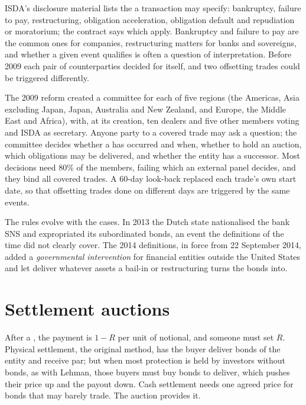 ISDA's disclosure material lists the  a transaction may specify:
bankruptcy, failure to pay, restructuring, obligation acceleration, obligation default
and repudiation or moratorium; the contract says which apply. Bankruptcy and failure to
pay are the common ones for companies, restructuring matters for banks and sovereigns,
and whether a given event qualifies is often a question of interpretation. Before
2009 each pair of counterparties decided for itself, and two offsetting trades could
be triggered differently.

The 2009 reform created a committee for each of five regions (the Americas, Asia
excluding Japan, Japan, Australia and New Zealand, and Europe, the Middle East and
Africa), with, at its creation, ten dealers and five other members voting and ISDA as
secretary. Anyone party to a covered trade may ask a question; the committee decides
whether a  has occurred and when, whether to hold an auction, which
obligations may be delivered, and whether the entity has a successor. Most decisions
need 80\% of the members, failing which an external panel decides, and they bind all
covered trades. A 60-day look-back replaced each trade's own start date, so that
offsetting trades done on different days are triggered by the same events.

The rules evolve with the cases. In 2013 the Dutch state nationalised the bank SNS
and expropriated its subordinated bonds, an event the definitions of the time did not
clearly cover. The 2014 definitions, in force from 22 September 2014, added a
\emph{governmental intervention}  for financial entities outside the
United States and let  deliver whatever assets a bail-in or
restructuring turns the bonds into.

\section{Settlement auctions}

After a , the payment is $1 - R$ per unit of notional, and someone must
set $R$. Physical settlement, the original method, has the buyer deliver bonds of the
entity and receive par; but when most protection is held by investors without bonds, as
with Lehman, those buyers must buy bonds to deliver, which pushes their price up and the payout down.
Cash settlement needs one agreed price for bonds that may barely trade. The auction
provides it.

